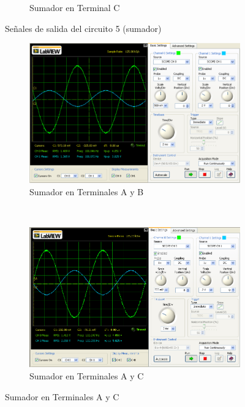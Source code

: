 \documentclass[]{article}
\begin{document}
\begin{figure}[h!]
\begin{subfigure}[b]{0.45\textwidth}
		\caption{Sumador en Terminal C}
		\label{fig:circuito5sumadorVC}
	\end{subfigure}
	\caption{Señales de salida del circuito 5 (sumador)}\label{fig:circuitoSumadorOutput}
	
\end{figure}

\begin{figure}[h!]
	
	\centering
	\begin{subfigure}[b]{0.45\textwidth}
		\includegraphics[width=\textwidth]{Imagenes/VAmasVB.png}
		\caption{Sumador en Terminales A y B}
		\label{fig:VAmasVB}
	\end{subfigure}
	~ 
	\begin{subfigure}[b]{0.45\textwidth}
		\includegraphics[width=\textwidth]{Imagenes/VAmasVC.png}
		\caption{Sumador en Terminales A y C}
		\label{fig:VAmasVC}

\end{subfigure}
\end{figure}
\end{document}
